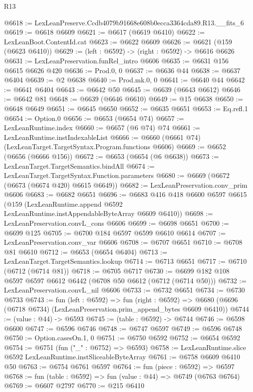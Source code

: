 \begin{lexlean}{R13}
\begin{coremodule}
@6618 := LexLeanPreserve.Ccdb4079b91668e608b0ecca3364cda89.R13.__fits_6
@6619 := @6618 @6609
@6621 := @6617 (@6619 @6410)
@6622 := LexLeanBoot.ContentId.cat
@6623 := @6622 @6609
@6626 := @6621 (@159 (@6623 @6410))
@6629 := (left : @6592) -> (right : @6592) -> @6616 @6626
@6631 := LexLeanPreservation.funRel_intro @6606
@6635 := @6631 @156 @6615 @6626 @420
@6636 := Prod.{0, 0}
@6637 := @6636 @44
@6638 := @6637 @6404
@6639 := @2 @6638
@6640 := Prod.mk.{0, 0}
@6641 := @6640 @44
@6642 := @6641 @6404
@6643 := @6642 @50
@6645 := @6639 (@6643 @6612)
@6646 := @6642 @81
@6648 := @6639 (@6646 @6610)
@6649 := @15 @6638
@6650 := @6648 @6649
@6651 := @6645 @6650
@6652 := @6635 @6651
@6653 := Eq.refl.{1}
@6654 := Option.{0}
@6656 := @6653 (@6654 @74)
@6657 := LexLeanRuntime.index
@6660 := @6657 (@6 @74) @74
@6661 := LexLeanRuntime.instIndexableList
@6666 := @6660 (@6661 @74) (LexLeanTarget.TargetSyntax.Program.functions @6606)
@6669 := @6652 (@6656 (@6666 @156))
@6672 := @6653 (@6654 (@6 @6638))
@6673 := LexLeanTarget.TargetSemantics.bindAll
@6674 := LexLeanTarget.TargetSyntax.Function.parameters
@6680 := @6669 (@6672 (@6673 (@6674 @420) @6615 @6649))
@6682 := LexLeanPreservation.conv_prim @6606
@6683 := @6682 @6651
@6696 := @6683
    @416
    @418
    @6600
    @6597
    @6615
    (@159 (LexLeanRuntime.append @6592 LexLeanRuntime.instAppendableByteArray @6609 @6410))
@6698 := LexLeanPreservation.convL_cons @6606
@6699 := @6698 @6651
@6700 := @6699 @125
@6705 := @6700 @184 @6597 @6599 @6610 @6614
@6707 := LexLeanPreservation.conv_var @6606
@6708 := @6707 @6651
@6710 := @6708 @81 @6610
@6712 := @6653 (@6654 @6404)
@6713 := LexLeanTarget.TargetSemantics.lookup
@6714 := @6713 @6651
@6717 := @6710 (@6712 (@6714 @81))
@6718 := @6705 @6717
@6730 := @6699 @182 @108 @6597 @6597 @6612 @6442 (@6708 @50 @6612 (@6712 (@6714 @50)))
@6732 := LexLeanPreservation.convL_nil @6606
@6733 := @6732 @6651
@6734 := @6730 @6733
@6743 := fun (left : @6592) =>
  fun (right : @6592) =>
  @6680 (@6696 (@6718 @6734) (LexLeanPreservation.prim_append_bytes @6609 @6410))
@6744 := (value : @44) -> @6593
@6745 := (table : @6592) -> @6744
@6746 := @6598 @6600
@6747 := @6596 @6746
@6748 := @6747 @6597
@6749 := @6596 @6748
@6750 := Option.casesOn.{1, 0}
@6751 := @6750 @6592
@6752 := @6654 @6592
@6754 := @6751 (fun ("_" : @6752) => @6593)
@6758 := LexLeanRuntime.slice @6592 LexLeanRuntime.instSliceableByteArray
@6761 := @6758 @6609 @6410 @50
@6763 := @6754 @6761 @6597
@6764 := fun (piece : @6592) => @6597
@6768 := fun (table : @6592) => fun (value : @44) => @6749 (@6763 @6764)
@6769 := @6607 @2797
@6770 := @215 @6410

\end{coremodule}
\end{lexlean}
